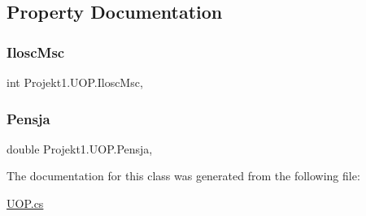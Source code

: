 \subsection{Property Documentation}
\mbox{\label{class_projekt1_1_1_u_o_p_a83eff9248d531ebf8100a0d8dfc3be68}} 
\subsubsection{\texorpdfstring{IloscMsc}{IloscMsc}}
{\footnotesize\ttfamily int Projekt1.\+U\+O\+P.\+Ilosc\+Msc\hspace{0.3cm}{\ttfamily [get]}, {}}

\mbox{\label{class_projekt1_1_1_u_o_p_aaa438ab39a784fd66ad75d898e3a0eea}} 
\subsubsection{\texorpdfstring{Pensja}{Pensja}}
{\footnotesize\ttfamily double Projekt1.\+U\+O\+P.\+Pensja\hspace{0.3cm}{\ttfamily [get]}, {}}



The documentation for this class was generated from the following file\+:\begin{DoxyCompactItemize}
\item 
\mbox{\hyperlink{_u_o_p_8cs}{U\+O\+P.\+cs}}\end{DoxyCompactItemize}
